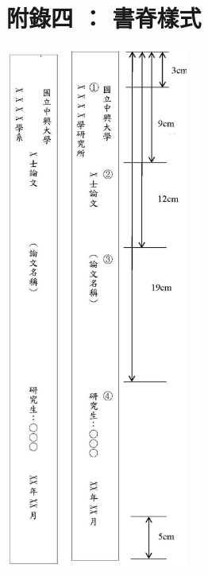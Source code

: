 \chapter{附錄四 ： 書脊樣式}
    \begin{center}
        \includegraphics[bb=0 0 638 1841,width=0.45\textwidth]{ridge.jpg}
    \end{center}
